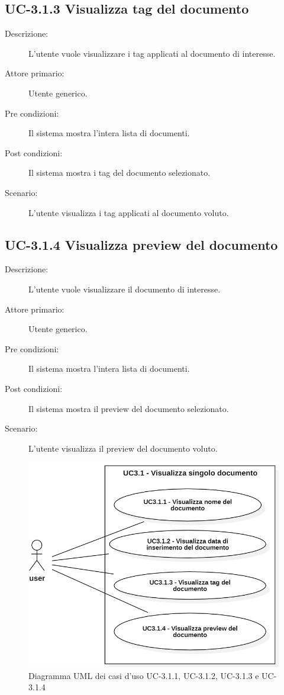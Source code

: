 \subsection{UC-3.1.3 Visualizza tag del documento}
\begin{description}
    \item[Descrizione:] L'utente vuole visualizzare i tag applicati al documento di interesse.
    \item[Attore primario:] Utente generico.
    \item[Pre condizioni:] Il sistema mostra l’intera lista di documenti.
    \item[Post condizioni:] Il sistema mostra i tag del documento selezionato.
    \item[Scenario:] L'utente visualizza i tag applicati al documento voluto.
\end{description}

\subsection{UC-3.1.4 Visualizza preview del documento}
\begin{description}
    \item[Descrizione:] L'utente vuole visualizzare il documento di interesse.
    \item[Attore primario:] Utente generico.
    \item[Pre condizioni:] Il sistema mostra l’intera lista di documenti.
    \item[Post condizioni:] Il sistema mostra il preview del documento selezionato.
    \item[Scenario:] L'utente visualizza il preview del documento voluto.
\end{description}

\begin{figure}[H]
    \centering
    \includegraphics[width=0.8\linewidth]{UC3.1.1-2-3-4.PNG}
    \caption{Diagramma UML dei casi d'uso UC-3.1.1, UC-3.1.2, UC-3.1.3 e UC-3.1.4}
    \label{fig:UC3.1.1-2-3-4}
\end{figure}

